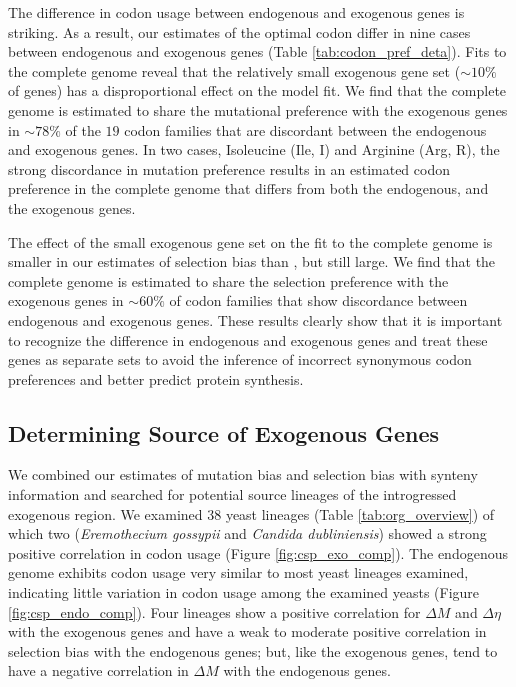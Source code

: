 \documentclass[fleqn,letterpaper]{article}
\begin{document}
The difference in codon usage between endogenous and exogenous genes is striking.
As a result, our estimates of the optimal codon differ in nine cases between endogenous and exogenous genes (Table \ref{tab:codon_pref_deta}).
Fits to the complete \kluyveri genome reveal that the relatively small exogenous gene set ($\sim 10\%$ of genes) has a disproportional effect on the model fit.
We find that the complete \kluyveri genome is estimated to share the mutational preference with the exogenous genes in $\sim78\%$ of the $19$ codon families that are discordant between the endogenous and exogenous genes.
In two cases, Isoleucine (Ile, I) and Arginine (Arg, R), the strong discordance in mutation preference results in an estimated codon preference in the complete \kluyveri genome that differs from both the endogenous, and the exogenous genes.

The effect of the small exogenous gene set on the fit to the complete \kluyveri genome is smaller in our estimates of selection bias \DE than \DM, but still large.
We find that the complete \kluyveri genome is estimated to share the selection preference with the exogenous genes in $\sim60\%$ of codon families that show discordance between endogenous and exogenous genes.
These results clearly show that it is important to recognize the difference in endogenous and exogenous genes and treat these genes as separate sets to avoid the inference of incorrect synonymous codon preferences and better predict protein synthesis.

\subsection*{Determining Source of Exogenous Genes}

We combined our estimates of mutation bias \DM and selection bias \DE with synteny information and searched for potential source lineages of the introgressed exogenous region.
We examined 38 yeast lineages (Table \ref{tab:org_overview}) of which two (\emph{Eremothecium gossypii} and \emph{Candida dubliniensis}) showed a strong positive correlation in codon usage (Figure \ref{fig:csp_exo_comp}).
The endogenous \kluyveri genome exhibits codon usage very similar to most yeast lineages examined, indicating little variation in codon usage among the examined yeasts (Figure \ref{fig:csp_endo_comp}).
Four lineages show a positive correlation for $\Delta M$ and $\Delta \eta$ with the exogenous genes and have a weak to moderate positive correlation in selection bias with the endogenous genes; but, like the exogenous genes, tend to have a negative correlation in $\Delta M$ with the endogenous genes.
\end{document}
